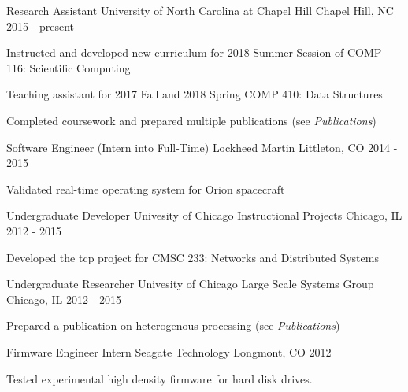 
\begin{cventries}
  \cventry
    {Research Assistant} %
    {University of North Carolina at Chapel Hill} %
    {Chapel Hill, NC} %
    {2015 - present} %
    {
      \begin{cvitems} %
        \item {Instructed and developed new curriculum for 2018 Summer Session of COMP 116:  Scientific Computing}
        \item {Teaching assistant for 2017 Fall and 2018 Spring COMP 410: Data Structures}
        \item {Completed coursework and prepared multiple publications (see \textit{Publications})}
      \end{cvitems}
    }

  \cventry
    {Software Engineer (Intern into Full-Time)} %
    {Lockheed Martin} %
    {Littleton, CO} %
    {2014 - 2015} %
    {
      \begin{cvitems} %
        \item {Validated real-time operating system for Orion spacecraft}
      \end{cvitems}
    }

  \cventry
    {Undergraduate Developer} %
    {Univesity of Chicago \chi Instructional Projects} %
    {Chicago, IL} %
    {2012 - 2015} %
    {
      \begin{cvitems} %
        \item {Developed the \chi tcp project for CMSC 233: Networks and Distributed Systems}
      \end{cvitems}
    }

  \cventry
    {Undergraduate Researcher} %
    {Univesity of Chicago Large Scale Systems Group} %
    {Chicago, IL} %
    {2012 - 2015} %
    {
      \begin{cvitems} %
        \item {Prepared a publication on heterogenous processing (see \textit{Publications})}
      \end{cvitems}
    }

  \cventry
    {Firmware Engineer Intern} %
    {Seagate Technology} %
    {Longmont, CO} %
    {2012} %
    {
      \begin{cvitems} %
        \item {Tested experimental high density firmware for hard disk drives.}
      \end{cvitems}
    }


\end{cventries}
